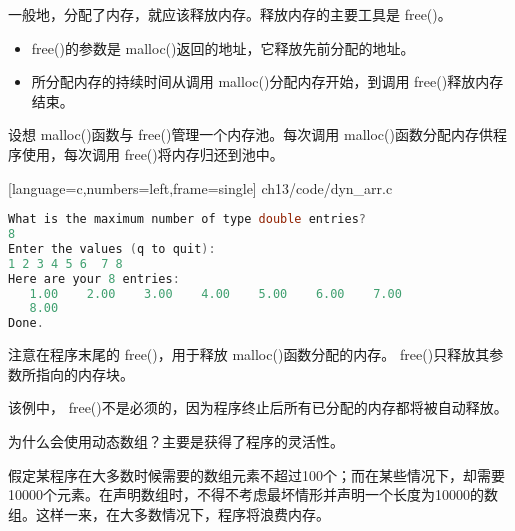 \begin{frame}[fragile]\ft{\secname}
  一般地，分配了内存，就应该释放内存。释放内存的主要工具是{ free()}。
  \begin{itemize}
  \item { free()}的参数是{ malloc()}返回的地址，它释放先前分配的地址。
  \item 所分配内存的持续时间从调用{ malloc()}分配内存开始，到调用{ free()}释放内存结束。
  \end{itemize}
\end{frame}


\begin{frame}[fragile]\ft{\secname}
  设想{ malloc()}函数与{ free()}管理一个内存池。每次调用{ malloc()}函数分配内存供程序使用，每次调用{ free()}将内存归还到池中。
\end{frame}

\begin{frame}\ft{\secname}
  
  [language=c,numbers=left,frame=single]
  {ch13/code/dyn_arr.c}
\end{frame}


\begin{frame}[fragile]\ft{\secname}
  \begin{lstlisting}[language=c,backgroundcolor=\color{red!20}] 
What is the maximum number of type double entries?
8
Enter the values (q to quit): 
1 2 3 4 5 6  7 8
Here are your 8 entries:
   1.00    2.00    3.00    4.00    5.00    6.00    7.00 
   8.00 
Done.   
  \end{lstlisting}
\end{frame}

\begin{frame}[fragile]\ft{\secname}
  注意在程序末尾的{ free()}，用于释放{ malloc()}函数分配的内存。{ free()}只释放其参数所指向的内存块。
  \vspace{0.1in}

  该例中，{ free()}不是必须的，因为程序终止后所有已分配的内存都将被自动释放。
\end{frame}


\begin{frame}[fragile]\ft{\secname}
  为什么会使用动态数组？主要是获得了程序的灵活性。\vspace{0.1in}

  假定某程序在大多数时候需要的数组元素不超过100个；而在某些情况下，却需要10000个元素。在声明数组时，不得不考虑最坏情形并声明一个长度为10000的数组。这样一来，在大多数情况下，程序将浪费内存。
\end{frame}


